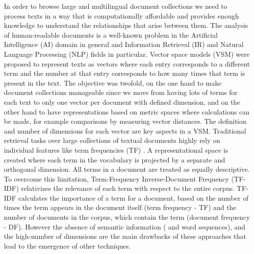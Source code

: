 In order to browse large and multilingual document collections we need to process texts in a way that is computationally affordable and provides enough knowledge to understand the relationships that arise between them. The analysis of human-readable documents is a well-known problem in the Artificial Intelligence (AI) domain in general and Information Retrieval (IR) and Natural Language Processing (NLP) fields in particular. Vector space models (VSM) \citep{Salton1983} were proposed to represent texts as vectors where each entry corresponds to a different term and the number at that entry corresponds to how many times that term is present in the text. The objective was twofold, on the one hand to make document collections manageable since we move from having lots of terms for each text to only one vector per document with defined dimension, and on the other hand to have representations based on metric spaces where calculations can be made, for example comparisons by measuring vector distances. The definition and number of dimensions for each vector are key aspects in a VSM. Traditional retrieval tasks over large collections of textual documents highly rely on individual features like term frequencies (TF) \citep{Hearst1999}. A representational space is created where each term in the vocabulary is projected by a separate and orthogonal dimension. All terms in a document are treated as equally descriptive. To overcome this limitation, Term-Frequency Inverse-Document Frequency (TF-IDF) \citep{Manning2008} relativizes the relevance of each term with respect to the entire corpus. TF-IDF calculates the importance of a term for a document, based on the number of times the term appears in the document itself (term frequency - TF) and the number of documents in the corpus, which contain the term (document frequency - DF). However the absence of semantic information ( and word sequences), and the high-number of dimensions are the main drawbacks of these approaches that lead to the emergence of other techniques. 

